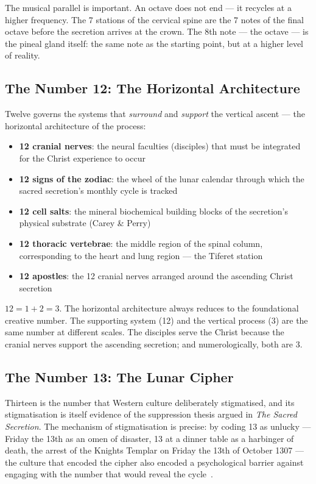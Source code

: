 \documentclass[12pt, a4paper]{article}
\begin{document}
The musical parallel is important. An octave does not end — it recycles at a
higher frequency. The 7 stations of the cervical spine are the 7 notes of the
final octave before the secretion arrives at the crown. The 8th note — the
octave — is the pineal gland itself: the same note as the starting point, but
at a higher level of reality.

\subsection{The Number 12: The Horizontal Architecture}

Twelve governs the systems that \emph{surround} and \emph{support} the
vertical ascent — the horizontal architecture of the process:

\begin{itemize}[leftmargin=1.5cm]
  \item \textbf{12 cranial nerves}: the neural faculties (disciples) that must be
  integrated for the Christ experience to occur
  \item \textbf{12 signs of the zodiac}: the wheel of the lunar calendar through
  which the sacred secretion's monthly cycle is tracked
  \item \textbf{12 cell salts}: the mineral biochemical building blocks of the
  secretion's physical substrate (Carey \& Perry)
  \item \textbf{12 thoracic vertebrae}: the middle region of the spinal column,
  corresponding to the heart and lung region — the Tiferet station
  \item \textbf{12 apostles}: the 12 cranial nerves arranged around the ascending
  Christ secretion
\end{itemize}

$12 = 1 + 2 = 3$. The horizontal architecture always reduces to the foundational
creative number. The supporting system (12) and the vertical process (3) are
the same number at different scales. The disciples serve the Christ because the
cranial nerves support the ascending secretion; and numerologically, both are 3.

\subsection{The Number 13: The Lunar Cipher}

Thirteen is the number that Western culture deliberately stigmatised, and its
stigmatisation is itself evidence of the suppression thesis argued in
\emph{The Sacred Secretion}. The mechanism of stigmatisation is
precise: by coding 13 as unlucky — Friday the 13th as an omen of disaster, 13
at a dinner table as a harbinger of death, the arrest of the Knights Templar
on Friday the 13th of October 1307 — the culture that encoded the cipher also
encoded a psychological barrier against engaging with the number that would
reveal the cycle~\autocite{campion2008}.
\end{document}
